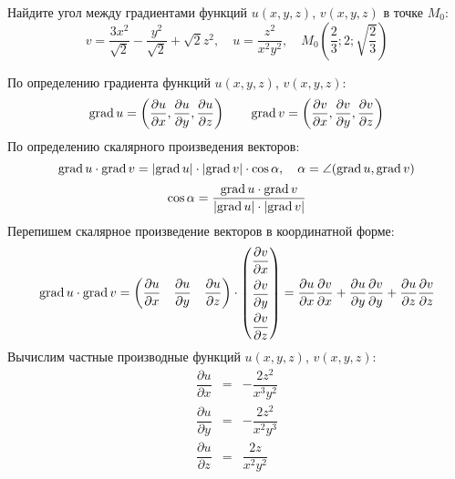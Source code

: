 \begin{problem}
Найдите угол между градиентами функций \( u(x,y,z) \), \( v(x,y,z) \) в точке \( M_0 \):
\[ v = \frac{3x^2}{\sqrt{2}} - \frac{y^2}{\sqrt{2}} + \sqrt{2}z^{2}, \quad u = \frac{z^2}{x^2y^2}, \quad M_0\left(\frac{2}{3};2;\sqrt{\frac{2}{3}}\right) \]
\end{problem}

\begin{solution}
  По определению градиента функций \( u(x,y,z) \), \( v(x,y,z) \):
  \[ \textrm{grad}\, u=\left(\dfrac{\partial u}{\partial x},\dfrac{\partial u}{\partial y},\dfrac{\partial u}{\partial z}\right)\qquad\textrm{grad}\, v=\left(\dfrac{\partial v}{\partial x},\dfrac{\partial v}{\partial y},\dfrac{\partial v}{\partial z}\right) \]
  По определению скалярного произведения векторов:
  \[
  \textrm{grad}\, u\cdot\textrm{grad}\, v = \left|\textrm{grad}\, u\right|\cdot\left|\textrm{grad}\, v\right|\cdot\cos\alpha, \quad \alpha = \angle(\textrm{grad}\, u, \textrm{grad}\, v)
  \]
  \begin{equation}
  \cos\alpha = \dfrac{\textrm{grad}\, u\cdot\textrm{grad}\, v}{\left|\textrm{grad}\, u\right|\cdot\left|\textrm{grad}\, v\right|} \label{eq:cos_alpha}
  \end{equation}
  Перепишем скалярное произведение векторов в координатной форме:
  \begin{equation}
  \textrm{grad}\, u\cdot\textrm{grad}\, v =
  \begin{pmatrix}
  \dfrac{\partial u}{\partial x} & \dfrac{\partial u}{\partial y} & \dfrac{\partial u}{\partial z}
  \end{pmatrix}
  \cdot
  \begin{pmatrix}
  \dfrac{\partial v}{\partial x} \\[2ex]
  \dfrac{\partial v}{\partial y} \\[2ex]
  \dfrac{\partial v}{\partial z}
  \end{pmatrix}
  =
  \frac{\partial u}{\partial x}\frac{\partial v}{\partial x}
  + \frac{\partial u}{\partial y}\frac{\partial v}{\partial y}
  + \frac{\partial u}{\partial z}\frac{\partial v}{\partial z}
  \label{eq:grad_dot_product}
  \end{equation}
  Вычислим частные производные функций \( u(x,y,z) \), \( v(x,y,z) \):
  \[
  \begin{array}{rcl}
  \dfrac{\partial u}{\partial x} & = & -\dfrac{2z^2}{x^3y^2} \\[2ex]
  \dfrac{\partial u}{\partial y} & = & -\dfrac{2z^2}{x^2y^3} \\[2ex]
  \dfrac{\partial u}{\partial z} & = & \dfrac{2z}{x^2y^2}
  \end{array}
\]
\end{solution}
